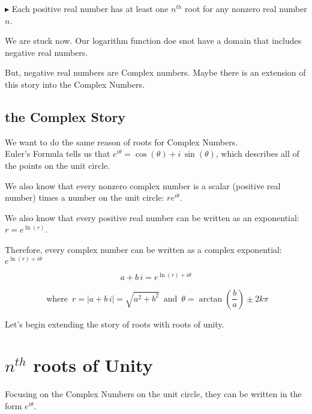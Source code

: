 \documentclass{ximera}
\begin{document}
$\blacktriangleright$ Each positive real number has at least one $n^{th}$ root for any nonzero real number $n$.



We are stuck now.  Our logarithm function doe snot have a domain that includes negative real numbers.

But, negative real numbers are Complex numbers.  Maybe there is an extension of this story into the Complex Numbers.












\subsection{the Complex Story}






We want to do the same reason of roots for Complex Numbers. \\


Euler's Formula tells us that $e^{i \theta} = \cos(\theta) + i \, \sin(\theta)$, which describes all of the points on the unit circle.

We also know that every nonzero complex number is a scalar (positive real number) times a number on the unit circle:  $r e^{i \theta}$.

We also know that every positive real number can be written as an exponential: $r = e^{\ln(r)}$.

Therefore, every complex number can be written as a complex exponential: $ e^{\ln(r) + i \theta}$


\[   a + b \, i =    e^{\ln(r) + i \theta}   \]

\[   \text{ where } \,   r = |a + b \, i| = \sqrt{a^2 + b^2}   \, \text{ and } \,   \theta = \arctan\left (\frac{b}{a} \right) \pm 2k\pi\]


Let's begin extending the story of roots with roots of unity.










\section{$n^{th}$ roots of Unity}


Focusing on the Complex Numbers on the unit circle, they can be written in the form $e^{i \theta}$.
\end{document}
